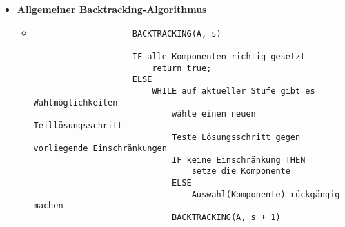 \begin{itemize}
        \item \textbf{Allgemeiner Backtracking-Algorithmus}
            \begin{itemize}
                \item[]
                    \begin{verbatim}
                    BACKTRACKING(A, s)

                    IF alle Komponenten richtig gesetzt
                        return true;
                    ELSE
                        WHILE auf aktueller Stufe gibt es Wahlmöglichkeiten
                            wähle einen neuen Teillösungsschritt
                            Teste Lösungsschritt gegen vorliegende Einschränkungen
                            IF keine Einschränkung THEN
                                setze die Komponente
                            ELSE
                                Auswahl(Komponente) rückgängig machen
                            BACKTRACKING(A, s + 1)
                    \end{verbatim}
            \end{itemize}
    \end{itemize}

